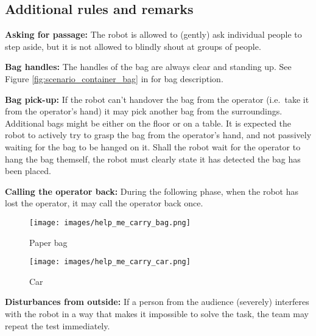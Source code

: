 \subsection{Additional rules and remarks}
\begin{enumerate}
  \begin{minipage}{0.65\textwidth}
  \item \textbf{Asking for passage:} The robot is allowed to (gently) ask individual people to step aside, but it is not allowed to blindly shout at groups of people.

  \item \textbf{Bag handles:} The handles of the bag are always clear and standing up. See Figure \ref{fig:scenario_container_bag} in  for bag description. \footnotemark

  \item \textbf{Bag pick-up:} If the robot can't handover the bag from the operator (i.e.~take it from the operator's hand) it may pick another bag from the surroundings. Additional bags might be either on the floor or on a table. It is expected the robot to actively try to grasp the bag from the operator's hand, and not passively waiting for the bag to be hanged on it. Shall the robot wait for the operator to hang the bag themself, the robot must clearly state it has detected the bag has been placed.

  \item \textbf{Calling the operator back:} During the following phase, when the robot has lost the operator, it may call the operator back once.
  \end{minipage}\hfill%
  \begin{minipage}{0.65\textwidth}
  \end{minipage}\hfill
  \begin{minipage}{0.25\textwidth}
    \vspace{-20pt}
    \begin{figure}[H]
      \centering
      \texttt{[image: images/help\_me\_carry\_bag.png]}%
      \vspace{-10pt}
      \caption{Paper bag}
      \label{fig:help_me_carry_paper_bag}
    \end{figure}
    \vspace{-10pt}
    \begin{figure}[H]
      \centering
      \texttt{[image: images/help\_me\_carry\_car.png]}%
      \vspace{-20pt}
      \label{fig:help_me_carry_car}
      \caption{Car}
    \end{figure}
  \end{minipage}
  \item \textbf{Disturbances from outside:} If a person from the audience (severely) interferes with the robot in a way that makes it impossible to solve the task, the team may repeat the test immediately.


\end{enumerate}
